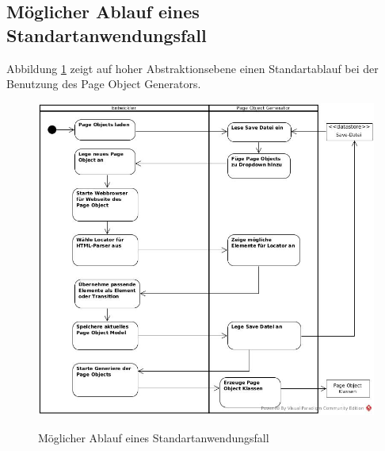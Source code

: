 \subsection{Möglicher Ablauf eines Standartanwendungsfall}
\label{sec:moeglicher_ablauf_eines_standartanwendungsfall}

Abbildung \ref{fig:sequenz} zeigt auf hoher Abstraktionsebene einen Standartablauf bei der Benutzung des Page Object Generators.



\begin{figure}[htb]
  \centering  
  \includegraphics[scale=0.45]{img/Activitydiagram.jpg}\\
  \caption{Möglicher Ablauf eines Standartanwendungsfall}
  \label{fig:sequenz}
\end{figure}

